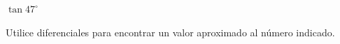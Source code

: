 \item $\tan 47^\circ$
\par
Utilice diferenciales para encontrar un valor aproximado al número indicado.
